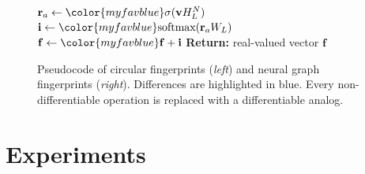 \documentclass{article}
\newcommand{\vv}{\mathbf{v}}
\newcommand{\vf}{\mathbf{f}}
\newcommand{\vi}{\mathbf{i}}
\newcommand{\vr}{\mathbf{r}}
\begin{document}
\begin{figure}[t]
\begin{minipage}[t]{0.49\columnwidth}
\begin{algorithm}[H]
\begin{algorithmic}[1]
		\State $\vr_a \leftarrow {\color{myfavblue} \sigma(\vv H_L^N)}$ 
		\State $\vi \leftarrow {\color{myfavblue} \textnormal{softmax}(\vr_a W_L)}$ 
		\State $\vf \leftarrow {\color{myfavblue} \vf + \vi}$ 
    \EndFor
\EndFor
\State \textbf{Return:} { {\color{myfavblue} real-valued} vector $\vf$}
\end{algorithmic}
\end{algorithm}
\end{minipage}
\hfill
\caption{Pseudocode of circular fingerprints (\emph{left}) and neural graph fingerprints (\emph{right}).
Differences are highlighted in blue.
Every non-differentiable operation is replaced with a differentiable analog.}
\end{figure}


\section{Experiments}
\label{sec:experiments}

\end{document}
